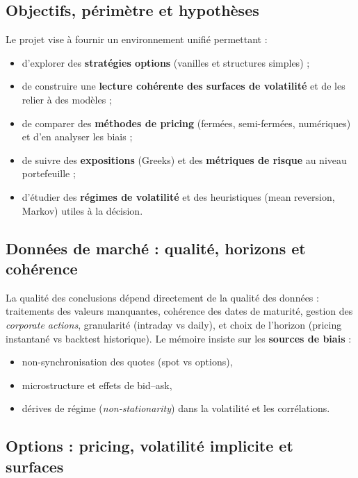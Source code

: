 \documentclass[11pt,a4paper]{article}
\newcommand{\1}{\mathbf{1}}
\begin{document}
\subsection{Objectifs, p\'erim\`etre et hypoth\`eses}

Le projet vise \`a fournir un environnement unifi\'e permettant :
\begin{itemize}
  \item d'explorer des \textbf{strat\'egies options} (vanilles et structures simples) ;
  \item de construire une \textbf{lecture coh\'erente des surfaces de volatilit\'e} et de les relier \`a des mod\`eles ;
  \item de comparer des \textbf{m\'ethodes de pricing} (ferm\'ees, semi-ferm\'ees, num\'eriques) et d'en analyser les biais ;
  \item de suivre des \textbf{expositions} (Greeks) et des \textbf{m\'etriques de risque} au niveau portefeuille ;
  \item d'\'etudier des \textbf{r\'egimes de volatilit\'e} et des heuristiques (mean reversion, Markov) utiles \`a la d\'ecision.
\end{itemize}

\subsection{Donn\'ees de march\'e : qualit\'e, horizons et coh\'erence}

La qualit\'e des conclusions d\'epend directement de la qualit\'e des donn\'ees : traitements des valeurs manquantes,
coh\'erence des dates de maturit\'e, gestion des \emph{corporate actions}, granularit\'e (intraday vs daily), et choix de
l'horizon (pricing instantan\'e vs backtest historique). Le m\'emoire insiste sur les \textbf{sources de biais} :
\begin{itemize}
  \item non-synchronisation des quotes (spot vs options),
  \item microstructure et effets de bid--ask,
  \item d\'erives de r\'egime (\emph{non-stationarity}) dans la volatilité et les corr\'elations.
\end{itemize}

\subsection{Options : pricing, volatilit\'e implicite et surfaces}
\end{document}
